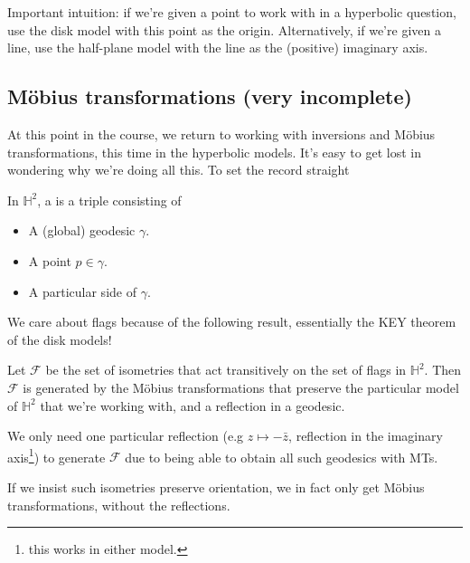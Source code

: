 \documentclass[11pt]{scrartcl}
\begin{document}
Important intuition: if we're given a point to work with in a hyperbolic question, use the disk model with this point as the origin. Alternatively, if we're given a line, use the half-plane model with the line as the (positive) imaginary axis.

\subsection{M{\"o}bius transformations (very incomplete)}

At this point in the course, we return to working with inversions and M{\"o}bius transformations, this time in the hyperbolic models. It's easy to get lost in wondering why we're doing all this. To set the record straight

\begin{definition}
In $\mathbb{H}^2$, a  is a triple consisting of

\begin{itemize}
    \item A (global) geodesic $\gamma$.
    \item A point $p \in \gamma$.
    \item A particular side of $\gamma$.
\end{itemize}
\end{definition}

We care about flags because of the following result, essentially the KEY theorem of the disk models!

\begin{proposition}
Let $\mathcal{F}$ be the set of isometries that act transitively on the set of flags in $\mathbb{H}^2$. Then $\mathcal{F}$ is generated by the M{\"o}bius transformations that preserve the particular model of $\mathbb{H}^2$ that we're working with, and a reflection in a geodesic.
\end{proposition}

\begin{remark}
We only need one particular reflection (e.g $z \mapsto - \bar{z}$, reflection in the imaginary axis\footnote{this works in either model.}) to generate $\mathcal{F}$ due to being able to obtain all such geodesics with MTs.
\end{remark}

\begin{remark}
If we insist such isometries preserve orientation, we in fact only get M{\"o}bius transformations, without the reflections.
\end{remark}
\end{document}
